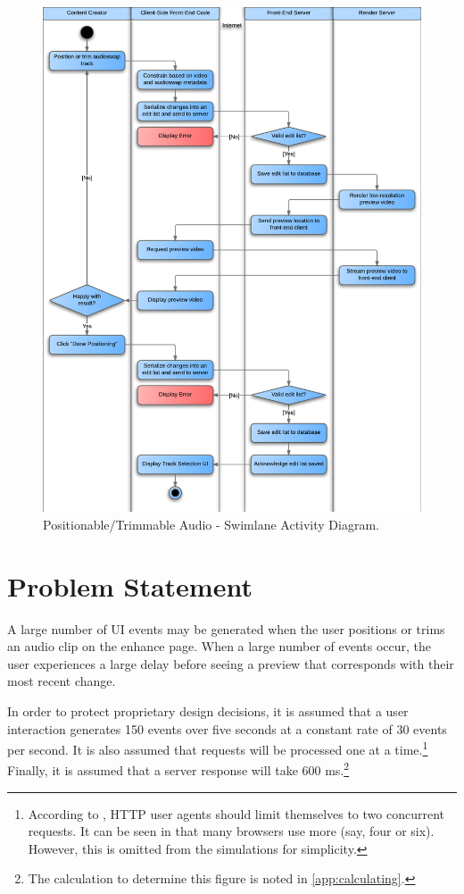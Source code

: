\documentclass[se,resubmit]{uw-wkrpt}
\begin{document}
\begin{figure}
  \centering
  \includegraphics{swimlane}
  \caption{Positionable/Trimmable Audio - Swimlane Activity Diagram.}
  \label{fig:swimlane}
\end{figure}

\section{Problem Statement}\label{sec:problem}
A large number of UI events may be generated when the user positions or trims an
audio clip on the enhance page. When a large number of events occur, the user
experiences a large delay before seeing a preview that corresponds with their
most recent change.

In order to protect proprietary design decisions, it is assumed that a user
interaction generates 150 events over five seconds at a constant rate of 30
events per second. It is also assumed that requests will be processed one at a
time.\footnote{According to \cite{ref:http}, HTTP user agents should limit
themselves to two concurrent requests. It can be seen in \cite{ref:b423377} that
many browsers use more (say, four or six). However, this is omitted from the
simulations for simplicity.} Finally, it is assumed that a server response will
take 600 ms.\footnote{The calculation to determine this figure is noted in
\ref{app:calculating}.}
\end{document}
